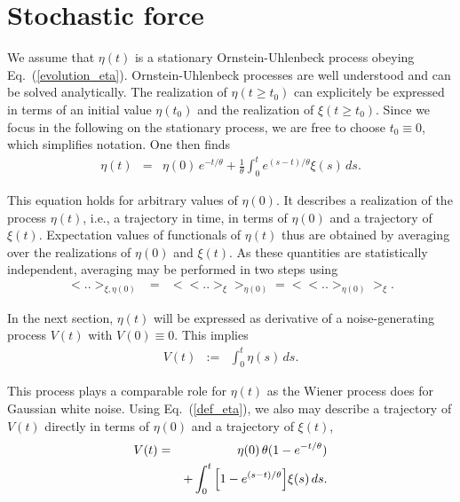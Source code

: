 \documentclass[aps,twocolumn,superscriptaddress,showpacs,showkeys]{revtex4}
\begin{document}
\section{Stochastic force}
\label{sec_noise}

\noindent We assume that $\eta(t)$ is a stationary Ornstein-Uhlenbeck process obeying Eq.~(\ref{evolution_eta}).
Ornstein-Uhlenbeck processes are well understood and can be solved analytically.
The realization of $\eta(t\ge t_0)$ can explicitely be expressed in terms of an initial value $\eta(t_0)$ and the
realization of $\xi(t\ge t_0)$.
Since we focus in the following on the stationary process, we are free to choose $t_0\equiv 0$, which simplifies notation.
One then finds
%
\begin{eqnarray}\label{def_eta}
\eta(t) &=& \eta(0)\,e^{-t/\theta}+\frac{1}{\theta} \int_{0}^t e^{(s-t)/\theta}\xi(s)\,ds.
\end{eqnarray}

\noindent This equation holds for arbitrary values of $\eta(0)$. It describes a realization of the process $\eta(t)$,
i.e., a trajectory in time, in terms of $\eta(0)$ and a trajectory of $\xi(t)$.
Expectation values of functionals of $\eta(t)$ thus are obtained by averaging over the realizations of $\eta(0)$ and $\xi(t)$.
As these quantities are statistically independent, averaging may be performed in two steps using
%
\begin{eqnarray}
\big<..\big>_{\xi,\eta(0)} &=& \big<\big<..\big>_\xi\big>_{\eta(0)} = \big<\big<..\big>_{\eta(0)}\big>_\xi.
\end{eqnarray}

\noindent In the next section, $\eta(t)$ will be expressed as derivative of a noise-generating process $V(t)$ with
$V(0)\equiv 0$. This implies
%
\begin{eqnarray}\label{def_V}
V(t) &:=& \int_0^t \eta(s)\, ds.
\end{eqnarray}

\noindent This process plays a comparable role for $\eta(t)$ as the Wiener process does for Gaussian white noise.
Using Eq.~(\ref{def_eta}), we also may describe a trajectory of $V(t)$ directly in terms of $\eta(0)$ and a trajectory
of $\xi(t)$,
%
\begin{eqnarray}\label{def2_V}
V(t) &=& \eta(0)\,\theta(1-e^{-t/\theta}) \cr
     &&  +\int_0^t\left[1-e^{(s-t)/\theta}\right]\!\xi(s)\,ds.
\end{eqnarray}
\end{document}
